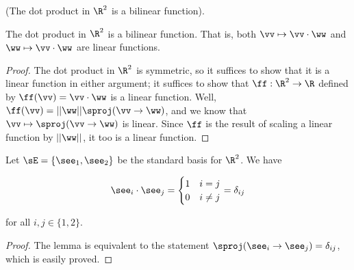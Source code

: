 \begin{theorem}
\label{ch::lin_alg::thm::geom_dot_product_bilinear}
    (The dot product in $\R^2$ is a bilinear function).
    
    The dot product in $\R^2$ is a bilinear function. That is, both $\vv \mapsto \vv \cdot \ww$ and $\ww \mapsto \vv \cdot \ww$ are linear functions.
\end{theorem}

\begin{proof}
    The dot product in $\R^2$ is symmetric, so it suffices to show that it is a linear function in either argument; it suffices to show that $\ff:\R^2 \rightarrow \R$ defined by $\ff(\vv) = \vv \cdot \ww$ is a linear function. Well, ${\ff(\vv) = ||\ww||\sproj(\vv \rightarrow \ww)}$, and we know that $\vv \mapsto \sproj(\vv \rightarrow \ww)$ is linear. Since $\ff$ is the result of scaling a linear function by $||\ww||$, it too is a linear function.
\end{proof}

\begin{lemma}
    Let $\sE = \{\see_1, \see_2 \}$ be the standard basis for $\R^2$. We have
    
    \begin{align*}
        \see_i \cdot \see_j = 
        \begin{cases}
            1 & i = j \\
            0 & i \neq j
        \end{cases}
        = \delta_{ij}
    \end{align*}

    for all $i, j \in \{1, 2\}$.
\end{lemma}

\begin{proof}
   The lemma is equivalent to the statement $\sproj(\see_i \rightarrow \see_j) = \delta_{ij}$, which is easily proved.
\end{proof}

